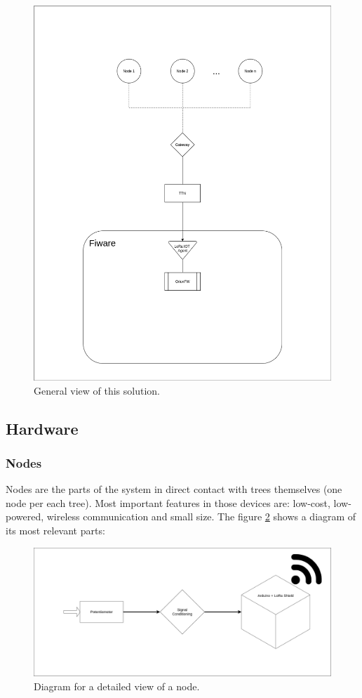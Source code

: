 \documentclass[11pt,a4paper,dvipsnames,twoside]{article}
\begin{document}
\begin{figure}[htp]
  \centering
  \includegraphics[width=.73\textwidth]{../schemes/main_scheme_tbg.png}
  \caption{General view of this solution.}
  \label{fig:GenView}
\end{figure}

\subsection{Hardware}

\subsubsection{Nodes}
Nodes are the parts of the system in direct contact with trees themselves (one node per each tree). Most important features in those devices are: low-cost, low-powered, wireless communication and small size. The figure \ref{fig:NodeDiag} shows a diagram of its most relevant parts:

\begin{figure}[htp]
  \centering
  \includegraphics[width=.9\textwidth]{../schemes/node_tbg.png}
  \caption{Diagram for a detailed view of a node.}
  \label{fig:NodeDiag}
\end{figure}
\end{document}
